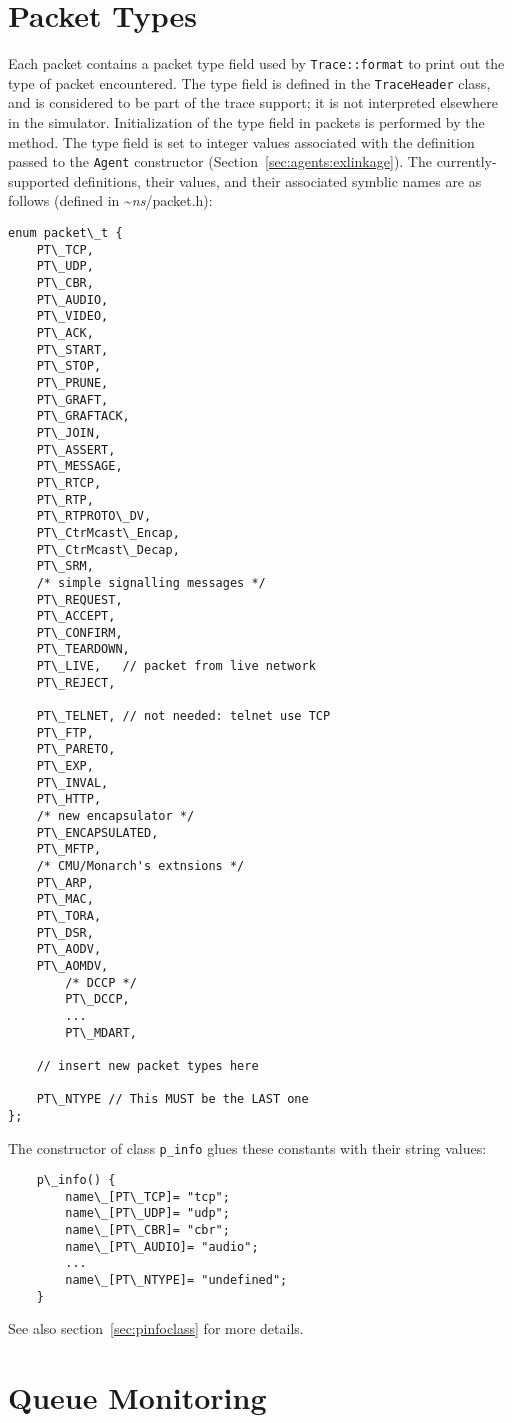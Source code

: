 \section{Packet Types}
\label{sec:traceptype}

Each packet contains a packet type field used by {\tt Trace::format}
to print out the type of packet encountered.
The type field is defined in the {\tt TraceHeader} class, and is considered
to be part of the trace support; it is not interpreted
elsewhere in the simulator.
Initialization of the type field in packets is performed by the
 method.
The type field is set to integer values associated with the
definition passed to
the {\tt Agent} constructor (Section~\ref{sec:agents:exlinkage}).
The currently-supported definitions, their values, and their
associated symblic names are as follows
(defined in \textasciitilde\emph{ns}/{packet.h}):
\begin{verbatim}
enum packet\_t {
	PT\_TCP,
	PT\_UDP,
	PT\_CBR,
	PT\_AUDIO,
	PT\_VIDEO,
	PT\_ACK,
	PT\_START,
	PT\_STOP,
	PT\_PRUNE,
	PT\_GRAFT,
	PT\_GRAFTACK,
	PT\_JOIN,
	PT\_ASSERT,
	PT\_MESSAGE,
	PT\_RTCP,
	PT\_RTP,
	PT\_RTPROTO\_DV,
	PT\_CtrMcast\_Encap,
	PT\_CtrMcast\_Decap,
	PT\_SRM,
	/* simple signalling messages */
	PT\_REQUEST,	
	PT\_ACCEPT,	
	PT\_CONFIRM,	
	PT\_TEARDOWN,	
	PT\_LIVE,	// packet from live network
	PT\_REJECT,

	PT\_TELNET,	// not needed: telnet use TCP
	PT\_FTP,
	PT\_PARETO,
	PT\_EXP,
	PT\_INVAL,
	PT\_HTTP,
	/* new encapsulator */
	PT\_ENCAPSULATED,
	PT\_MFTP,
	/* CMU/Monarch's extnsions */
	PT\_ARP,
	PT\_MAC,
	PT\_TORA,
	PT\_DSR,
	PT\_AODV,
	PT\_AOMDV,
        /* DCCP */
        PT\_DCCP,
        ...
        PT\_MDART,

	// insert new packet types here

	PT\_NTYPE // This MUST be the LAST one
};
\end{verbatim}
The constructor of class {\tt p\_info} glues these constants with
their string values:
\begin{verbatim}
	p\_info() {
		name\_[PT\_TCP]= "tcp";
		name\_[PT\_UDP]= "udp";
		name\_[PT\_CBR]= "cbr";
		name\_[PT\_AUDIO]= "audio";
		...
		name\_[PT\_NTYPE]= "undefined";
	}
\end{verbatim}
See also section~\ref{sec:pinfoclass} for more details.

\section{Queue Monitoring}
\label{sec:qmonitor}

